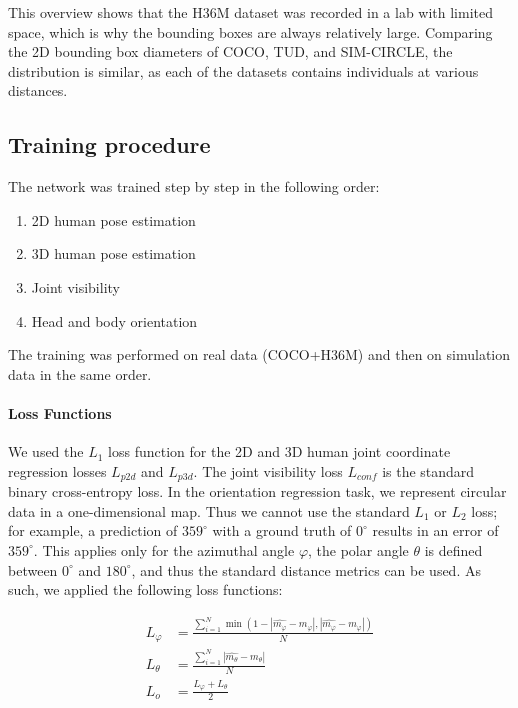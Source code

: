 \documentclass[a4paper, 10pt, conference]{ieeeconf}
\begin{document}
This overview shows that the H36M dataset was recorded in a lab with limited space, which is why the bounding boxes are always relatively large. Comparing the 2D bounding box diameters of COCO, TUD, and SIM-CIRCLE, the distribution is similar, as each of the datasets contains individuals at various distances.

\subsection{Training procedure}
\label{sec:pedrec:training}
The network was trained step by step in the following order:

\begin{enumerate}
  \item 2D human pose estimation
  \item 3D human pose estimation
  \item Joint visibility
  \item Head and body orientation
\end{enumerate}

The training was performed on real data (COCO+H36M) and then on simulation data in the same order. 

\paragraph{Loss Functions}
\label{sec:pedrec:loss_functions}
We used the $L_1$ loss function for the 2D and 3D human joint coordinate regression losses $L_{p2d}$ and $L_{p3d}$. The joint visibility loss $L_{conf}$ is the standard binary cross-entropy loss. In the orientation regression task, we represent circular data in a one-dimensional map. Thus we cannot use the standard $L_1$ or $L_2$ loss; for example, a prediction of $359^{\circ}$ with a ground truth of $0^{\circ}$ results in an error of $359^{\circ}$. This applies only for the azimuthal angle $\varphi$, the polar angle $\theta$ is defined between $0^{\circ}$ and $180^{\circ}$, and thus the standard distance metrics can be used. As such, we applied the following loss functions:

\begin{align}
  L_\varphi &= \frac{\sum_{i=1}^{N} \min{(1 - |\hat{m_{\varphi}} - m_{\varphi}|, |\hat{m_{\varphi}} - m_{\varphi}|)}}{N} \label{eq:loss_o_phi}\\
  L_\theta &= \frac{\sum_{i=1}^{N} |\hat{m_{\theta}} - m_{\theta}|}{N} \label{eq:loss_o_theta}\\
  L_{o} &= \frac{L_\varphi + L_\theta}{2} \label{eq:loss_o}
\end{align}
\end{document}
